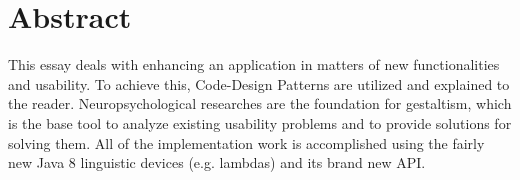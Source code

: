 \thispagestyle{empty}
\section*{Abstract}
This essay deals with enhancing an application in matters of new functionalities and usability. To achieve this, Code-Design Patterns are utilized and explained to the reader. Neuropsychological researches are the foundation for gestaltism, which is the base tool to analyze existing usability problems and to provide solutions for solving them. All of the implementation work is accomplished using the fairly new Java 8 linguistic devices (e.g. lambdas) and its brand new API.